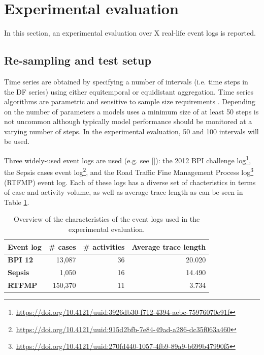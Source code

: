 \section{Experimental evaluation}\label{sec:experiment}
In this section, an experimental evaluation over X real-life event logs is reported.


\subsection{Re-sampling and test setup}
Time series are obtained by specifying a number of intervals (i.e. time steps in the DF series) using either equitemporal or equidistant aggregation.
Time series algorithms are parametric and sensitive to sample size requirements \cite{hanke2001business}.
Depending on the number of parameters a models uses a minimum size of at least 50 steps is not uncommon although typically model performance should be monitored at a varying number of steps.
In the experimental evaluation, 50 and 100 intervals will be used.

Three widely-used event logs are used (e.g. see []): the 2012 BPI challenge log\footnote{\url{https://doi.org/10.4121/uuid:3926db30-f712-4394-aebc-75976070e91f}}, the Sepsis cases event log\footnote{\url{https://doi.org/10.4121/uuid:915d2bfb-7e84-49ad-a286-dc35f063a460}}, and the Road Traffic Fine Management Process log\footnote{\url{https://doi.org/10.4121/uuid:270fd440-1057-4fb9-89a9-b699b47990f5}} (RTFMP) event log.
Each of these logs has a diverse set of chacteristics in terms of case and activity volume, as well as average trace length as can be seen in Table \ref{tab:eventlogs}.
\begin{table}[htbp]
  \centering
    \begin{tabular}{lrrr}
    \toprule
    \textbf{Event log} & \multicolumn{1}{l}{\textbf{\# cases}} & \multicolumn{1}{l}{\textbf{\# activities}} & \multicolumn{1}{l}{\textbf{Average trace length}} \\
    \midrule
    \textbf{BPI 12} & 13,087 & 36    & 20.020 \\
    \textbf{Sepsis} & 1,050 & 16    & 14.490 \\
    \textbf{RTFMP} & 150,370 & 11    & 3.734 \\
    \bottomrule
    \end{tabular}%
  \caption{Overview of the characteristics of the event logs used in the experimental evaluation.}
  \label{tab:eventlogs}%
\end{table}%

